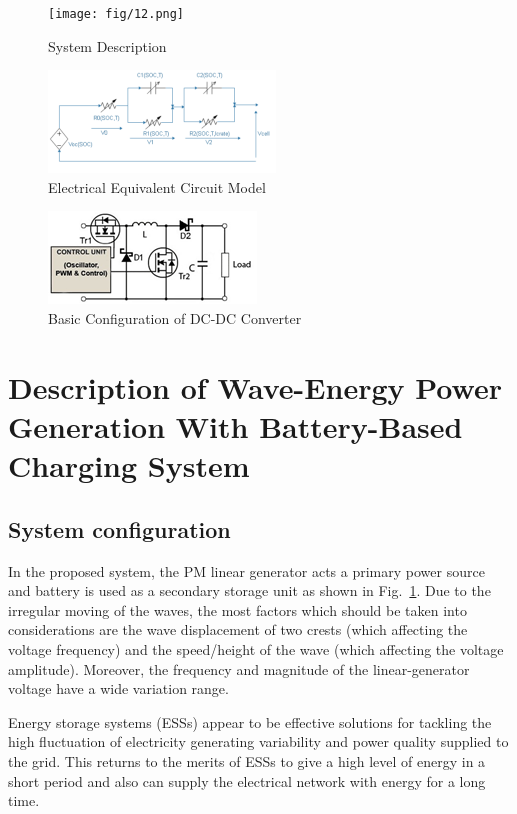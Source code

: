 \documentclass[conference]{IEEEtran}
\begin{document}
\begin{figure}[ht]
	\centerline{\texttt{[image: fig/12.png]}}
	\caption{ System Description  }
	\label{sys}
\end{figure}
\begin{figure}[htbp]
	\centerline{\includegraphics[width=2.9 in]{fig/13.png}}
	\caption{ Electrical Equivalent Circuit Model}
	\label{Electrical Equivalent Circuit Model}
\end{figure}
\begin{figure}[htbp]
	\centerline{\includegraphics[width=2 in]{fig/14.png}}
	\caption{ Basic Configuration of DC-DC Converter}
	\label{Basic Configuration of DC-DC Converter}
\end{figure}

\section{Description of Wave-Energy Power Generation With Battery-Based Charging System}
\subsection{System configuration}
In the proposed system, the PM linear generator acts a primary power source and battery is used as a secondary storage unit as shown in Fig.~\ref{sys}. Due to the irregular moving of the waves, the most factors which should be taken into considerations are the wave displacement of two crests (which affecting the voltage frequency) and the speed/height of the wave (which affecting the voltage amplitude). Moreover, the frequency and magnitude of the linear-generator voltage have a wide variation range.


Energy storage systems (ESSs) appear to be effective solutions for tackling the high fluctuation of electricity generating variability and power quality supplied to the grid. This returns to the merits of ESSs to give a high level of energy in a short period and also can supply the electrical network with energy for a long time.
\end{document}
